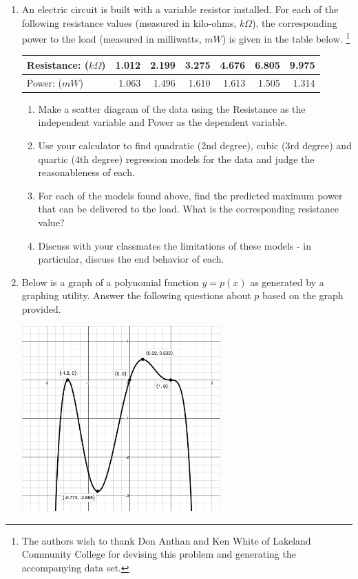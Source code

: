 \begin{enumerate}
\item \label{circuitexercisepoly} An electric circuit is built with a variable resistor installed.  For each of the following resistance values (measured in kilo-ohms, $k \Omega$),  the corresponding power to the load (measured in milliwatts, $mW$) is given in the table below. \footnote{The authors wish to thank Don Anthan and Ken White of Lakeland Community College for devising this problem and generating the accompanying data set.}

\noindent \begin{tabular}{|l|r|r|r|r|r|r|} \hline
Resistance: ($k \Omega$) & 1.012 & 2.199 & 3.275 & 4.676 & 6.805 & 9.975 \\ \hline
Power: ($mW$) & 1.063 & 1.496 & 1.610 & 1.613 & 1.505 & 1.314 \\ \hline
\end{tabular}

\begin{enumerate}

\item Make a scatter diagram of the data using the Resistance as the independent variable and Power as the dependent variable.

\item Use your calculator to find quadratic (2nd degree), cubic (3rd degree) and quartic (4th degree) regression models for the data and judge the reasonableness of each.

\item For each of the models found above, find the predicted maximum power that can be delivered to the load.  What is the corresponding resistance value?

\item Discuss with your classmates the limitations of these models - in particular, discuss the end behavior of each.

\end{enumerate}

\newpage

\item Below is a graph of  a polynomial function $y = p(x)$ as generated by a graphing utility.   Answer the following questions about $p$ based on the graph provided.


\centerline{\includegraphics[width=3in]{./GraphsofPolynomialsGraphics/GraphsofPolyExercise.jpg}}


\end{enumerate}
